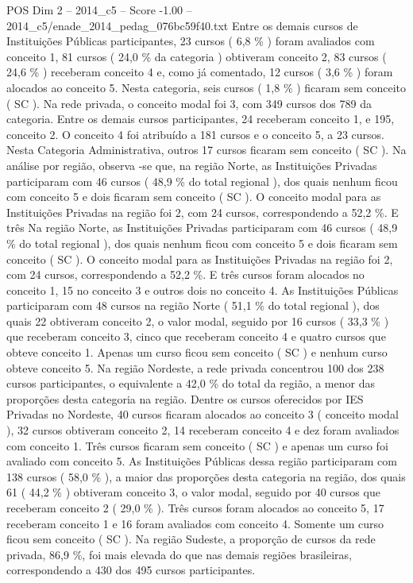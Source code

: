 \begin{textsample}{POS Dim 2 – 2014\_c5 – Score -1.00 – 2014\_c5/enade\_2014\_pedag\_076bc59f40.txt}
Entre os demais cursos de Instituições Públicas participantes, 23 cursos ( 6,8 \% ) foram avaliados com conceito 1, 81 cursos ( 24,0 \% da categoria ) obtiveram conceito 2, 83 cursos ( 24,6 \% ) receberam conceito 4 e, como já comentado, 12 cursos ( 3,6 \% ) foram alocados ao conceito 5.
Nesta categoria, seis cursos ( 1,8 \% ) ficaram sem conceito ( SC ).
Na rede privada, o conceito modal foi 3, com 349 cursos dos 789 da categoria.
Entre os demais cursos participantes, 24 receberam conceito 1, e 195, conceito 2.
O conceito 4 foi atribuído a 181 cursos e o conceito 5, a 23 cursos.
Nesta Categoria Administrativa, outros 17 cursos ficaram sem conceito ( SC ).
Na análise por região, observa -se que, na região Norte, as Instituições Privadas participaram com 46 cursos ( 48,9 \% do total regional ), dos quais nenhum ficou com conceito 5 e dois ficaram sem conceito ( SC ).
O conceito modal para as Instituições Privadas na região foi 2, com 24 cursos, correspondendo a 52,2 \%.
E três Na região Norte, as Instituições Privadas participaram com 46 cursos ( 48,9 \% do total regional ), dos quais nenhum ficou com conceito 5 e dois ficaram sem conceito ( SC ).
O conceito modal para as Instituições Privadas na região foi 2, com 24 cursos, correspondendo a 52,2 \%.
E três cursos foram alocados no conceito 1, 15 no conceito 3 e outros dois no conceito 4.
As Instituições Públicas participaram com 48 cursos na região Norte ( 51,1 \% do total regional ), dos quais 22 obtiveram conceito 2, o valor modal, seguido por 16 cursos ( 33,3 \% ) que receberam conceito 3, cinco que receberam conceito 4 e quatro cursos que obteve conceito 1.
Apenas um curso ficou sem conceito ( SC ) e nenhum curso obteve conceito 5.
Na região Nordeste, a rede privada concentrou 100 dos 238 cursos participantes, o equivalente a 42,0 \% do total da região, a menor das proporções desta categoria na região.
Dentre os cursos oferecidos por IES Privadas no Nordeste, 40 cursos ficaram alocados ao conceito 3 ( conceito modal ), 32 cursos obtiveram conceito 2, 14 receberam conceito 4 e dez foram avaliados com conceito 1.
Três cursos ficaram sem conceito ( SC ) e apenas um curso foi avaliado com conceito 5.
As Instituições Públicas dessa região participaram com 138 cursos ( 58,0 \% ), a maior das proporções desta categoria na região, dos quais 61 ( 44,2 \% ) obtiveram conceito 3, o valor modal, seguido por 40 cursos que receberam conceito 2 ( 29,0 \% ).
Três cursos foram alocados ao conceito 5, 17 receberam conceito 1 e 16 foram avaliados com conceito 4.
Somente um curso ficou sem conceito ( SC ).
Na região Sudeste, a proporção de cursos da rede privada, 86,9 \%, foi mais elevada do que nas demais regiões brasileiras, correspondendo a 430 dos 495 cursos participantes.

\end{textsample}
